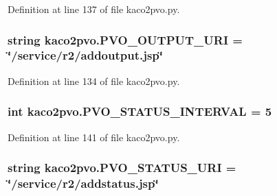 Definition at line 137 of file kaco2pvo.\+py.

\hypertarget{namespacekaco2pvo_aa9eb4b879b1b7bc4d18c426a30003d8a}{}
\subsubsection[{P\+V\+O\+\_\+\+O\+U\+T\+P\+U\+T\+\_\+\+U\+R\+I}]{\setlength{\rightskip}{0pt plus 5cm}string kaco2pvo.\+P\+V\+O\+\_\+\+O\+U\+T\+P\+U\+T\+\_\+\+U\+R\+I = \char`\"{}/service/r2/addoutput.\+jsp\char`\"{}}\label{namespacekaco2pvo_aa9eb4b879b1b7bc4d18c426a30003d8a}


Definition at line 134 of file kaco2pvo.\+py.

\hypertarget{namespacekaco2pvo_af394104e75126491b592392ef4a496c3}{}
\subsubsection[{P\+V\+O\+\_\+\+S\+T\+A\+T\+U\+S\+\_\+\+I\+N\+T\+E\+R\+V\+A\+L}]{\setlength{\rightskip}{0pt plus 5cm}int kaco2pvo.\+P\+V\+O\+\_\+\+S\+T\+A\+T\+U\+S\+\_\+\+I\+N\+T\+E\+R\+V\+A\+L = 5}\label{namespacekaco2pvo_af394104e75126491b592392ef4a496c3}


Definition at line 141 of file kaco2pvo.\+py.

\hypertarget{namespacekaco2pvo_a1c058de251e3097097b3ca46627e9572}{}
\subsubsection[{P\+V\+O\+\_\+\+S\+T\+A\+T\+U\+S\+\_\+\+U\+R\+I}]{\setlength{\rightskip}{0pt plus 5cm}string kaco2pvo.\+P\+V\+O\+\_\+\+S\+T\+A\+T\+U\+S\+\_\+\+U\+R\+I = \char`\"{}/service/r2/addstatus.\+jsp\char`\"{}}\label{namespacekaco2pvo_a1c058de251e3097097b3ca46627e9572}


